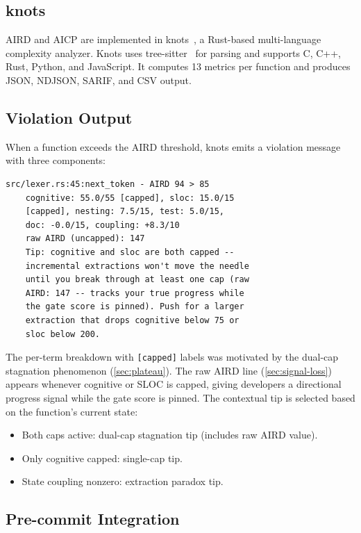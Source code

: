 \documentclass[10pt,twocolumn,letterpaper]{article}
\begin{document}
\subsection{knots}

AIRD and AICP are implemented in knots~\cite{knots}, a Rust-based
multi-language complexity analyzer.  Knots uses tree-sitter~\cite{tree-sitter}
for parsing and supports C, C++, Rust, Python, and JavaScript.  It
computes 13 metrics per function and produces JSON, NDJSON, SARIF, and
CSV output.

\subsection{Violation Output}

When a function exceeds the AIRD threshold, knots emits a violation
message with three components:

\begin{lstlisting}
src/lexer.rs:45:next_token - AIRD 94 > 85
    cognitive: 55.0/55 [capped], sloc: 15.0/15
    [capped], nesting: 7.5/15, test: 5.0/15,
    doc: -0.0/15, coupling: +8.3/10
    raw AIRD (uncapped): 147
    Tip: cognitive and sloc are both capped --
    incremental extractions won't move the needle
    until you break through at least one cap (raw
    AIRD: 147 -- tracks your true progress while
    the gate score is pinned). Push for a larger
    extraction that drops cognitive below 75 or
    sloc below 200.
\end{lstlisting}

The per-term breakdown with \texttt{[capped]} labels was motivated by
the dual-cap stagnation phenomenon (\cref{sec:plateau}).  The raw AIRD
line (\cref{sec:signal-loss}) appears whenever cognitive or SLOC is
capped, giving developers a directional progress signal while the gate
score is pinned.  The contextual tip is selected based on the function's
current state:
\begin{itemize}
    \item Both caps active: dual-cap stagnation tip (includes raw AIRD value).
    \item Only cognitive capped: single-cap tip.
    \item State coupling nonzero: extraction paradox tip.
\end{itemize}

\subsection{Pre-commit Integration}
\end{document}
